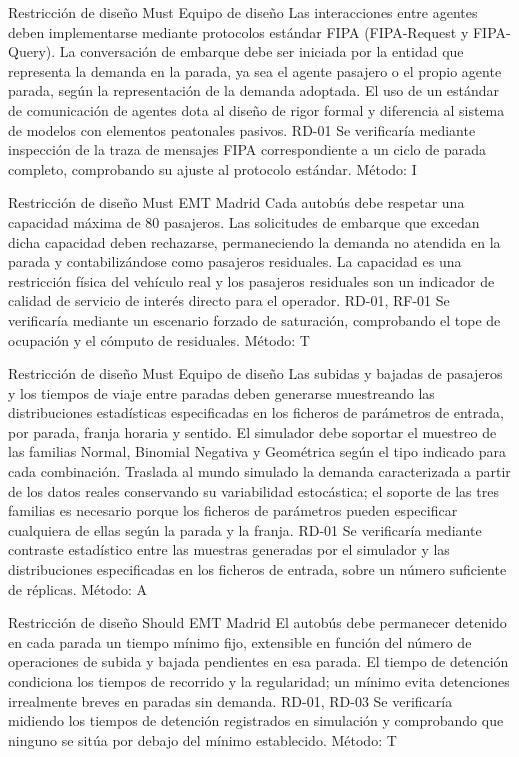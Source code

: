 {Restricción de diseño}
{Must}
{Equipo de diseño}
{Las interacciones entre agentes deben implementarse mediante protocolos estándar FIPA (FIPA-Request y FIPA-Query).
La conversación de embarque debe ser iniciada por la entidad que representa la demanda en la parada, ya sea el
agente pasajero o el propio agente parada, según la representación de la demanda adoptada.}
{El uso de un estándar de comunicación de agentes dota al diseño de rigor formal y diferencia al sistema de modelos
con elementos peatonales pasivos.}
{RD-01}
{Se verificaría mediante inspección de la traza de mensajes FIPA correspondiente a un ciclo de parada completo,
comprobando su ajuste al protocolo estándar. Método: I}

{Restricción de diseño}
{Must}
{EMT Madrid}
{Cada autobús debe respetar una capacidad máxima de 80 pasajeros. Las solicitudes de embarque que excedan dicha
capacidad deben rechazarse, permaneciendo la demanda no atendida en la parada y contabilizándose como pasajeros
residuales.}
{La capacidad es una restricción física del vehículo real y los pasajeros residuales son un indicador de calidad de
servicio de interés directo para el operador.}
{RD-01, RF-01}
{Se verificaría mediante un escenario forzado de saturación, comprobando el tope de ocupación y el cómputo de
residuales. Método: T}

{Restricción de diseño}
{Must}
{Equipo de diseño}
{Las subidas y bajadas de pasajeros y los tiempos de viaje entre paradas deben generarse muestreando las distribuciones
estadísticas especificadas en los ficheros de parámetros de entrada, por parada, franja horaria y sentido. El
simulador debe soportar el muestreo de las familias Normal, Binomial Negativa y Geométrica según el tipo indicado
para cada combinación.}
{Traslada al mundo simulado la demanda caracterizada a partir de los datos reales conservando su variabilidad
estocástica; el soporte de las tres familias es necesario porque los ficheros de parámetros pueden especificar
cualquiera de ellas según la parada y la franja.}
{RD-01}
{Se verificaría mediante contraste estadístico entre las muestras generadas por el simulador y las distribuciones
especificadas en los ficheros de entrada, sobre un número suficiente de réplicas. Método: A}

{Restricción de diseño}
{Should}
{EMT Madrid}
{El autobús debe permanecer detenido en cada parada un tiempo mínimo fijo, extensible en función del número de
operaciones de subida y bajada pendientes en esa parada.}
{El tiempo de detención condiciona los tiempos de recorrido y la regularidad; un mínimo evita detenciones irrealmente
breves en paradas sin demanda.}
{RD-01, RD-03}
{Se verificaría midiendo los tiempos de detención registrados en simulación y comprobando que ninguno se sitúa por
debajo del mínimo establecido. Método: T}

